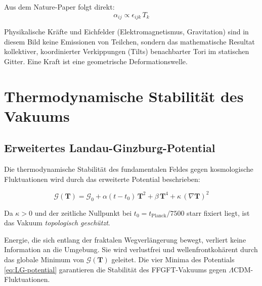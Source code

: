 Aus dem Nature-Paper folgt direkt:
\begin{equation}
  \alpha_{ij} \propto \epsilon_{ijk}\,T_k
  \label{eq:ME-approx}
\end{equation}

\begin{interpretation}
Physikalische Kräfte und Eichfelder (Elektromagnetismus, Gravitation) sind
in diesem Bild keine Emissionen von Teilchen, sondern das mathematische
Resultat kollektiver, koordinierter Verkippungen (Tilts) benachbarter Tori
im statischen Gitter. Eine Kraft ist eine geometrische Deformationswelle.
\end{interpretation}

\chapter{Thermodynamische Stabilität des Vakuums}

\section{Erweitertes Landau-Ginzburg-Potential}

Die thermodynamische Stabilität des fundamentalen Feldes gegen kosmologische
Fluktuationen wird durch das erweiterte Potential beschrieben:

\begin{equation}
  \mathcal{G}(\mathbf{T}) = \mathcal{G}_0
  + \alpha(t - t_0)\,\mathbf{T}^2
  + \beta\,\mathbf{T}^4
  + \kappa\,(\nabla\mathbf{T})^2
  \label{eq:LG-extended}
\end{equation}

Da $\kappa > 0$ und der zeitliche Nullpunkt bei $t_0 = t_{\mathrm{Planck}}/7500$
starr fixiert liegt, ist das Vakuum \emph{topologisch geschützt}.

\begin{foundation}
Energie, die sich entlang der fraktalen Wegverlängerung bewegt, verliert keine
Information an die Umgebung. Sie wird verlustfrei und wellenfrontkohärent durch
das globale Minimum von $\mathcal{G}(\mathbf{T})$ geleitet.
Die vier Minima des Potentials \eqref{eq:LG-potential} garantieren die
Stabilität des FFGFT-Vakuums gegen $\Lambda$CDM-Fluktuationen.
\end{foundation}

